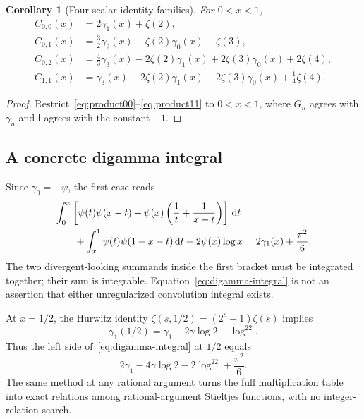 \documentclass[11pt]{article}
\numberwithin{equation}{section}
\newtheorem{corollary}[theorem]{Corollary}
\theoremstyle{definition}
\theoremstyle{remark}
\newcommand{\Id}{\mathsf I}
\newcommand{\dd}{\,\mathrm d}
\begin{document}
\begin{corollary}[Four scalar identity families]\label{cor:scalar}
For $0<x<1$,
\begin{align}
 C_{0,0}(x)&=2\gamma_1(x)+\zeta(2),\label{eq:C00}\\
 C_{0,1}(x)&=\frac32\gamma_2(x)-\zeta(2)\gamma_0(x)-\zeta(3),\label{eq:C01}\\
 C_{0,2}(x)&=\frac43\gamma_3(x)-2\zeta(2)\gamma_1(x)
                    +2\zeta(3)\gamma_0(x)+2\zeta(4),\label{eq:C02}\\
 C_{1,1}(x)&=\gamma_3(x)-2\zeta(2)\gamma_1(x)
                    +2\zeta(3)\gamma_0(x)+\frac14\zeta(4).
 \label{eq:C11}
\end{align}
\end{corollary}
\begin{proof}
Restrict~\eqref{eq:product00}--\eqref{eq:product11} to $0<x<1$, where
$G_n$ agrees with $\gamma_n$ and $\Id$ agrees with the constant $-1$.
\end{proof}

\subsection{A concrete digamma integral}
Since $\gamma_0=-\psi$, the first case reads
\begin{align}
 &\int_0^x\left[\psi(t)\psi(x-t)+\psi(x)\left(\frac1t+\frac1{x-t}\right)\right]\dd t
 \label{eq:digamma-integral}\\
 &\qquad+\int_x^1\psi(t)\psi(1+x-t)\dd t-2\psi(x)\log x
 =2\gamma_1(x)+\frac{\pi^2}{6}.\notag
\end{align}
The two divergent-looking summands inside the first bracket must be
integrated together; their sum is integrable. Equation~\eqref{eq:digamma-integral}
is not an assertion that either unregularized convolution integral exists.

At $x=1/2$, the Hurwitz identity
$\zeta(s,1/2)=(2^s-1)\zeta(s)$ implies
\[
 \gamma_1(1/2)=\gamma_1-2\gamma\log2-\log^22.
\]
Thus the left side of~\eqref{eq:digamma-integral} at $1/2$ equals
\begin{equation}\label{eq:half}
 2\gamma_1-4\gamma\log2-2\log^22+\frac{\pi^2}{6}.
\end{equation}
The same method at any rational argument turns the full multiplication
table into exact relations among rational-argument Stieltjes functions,
with no integer-relation search.
\end{document}
